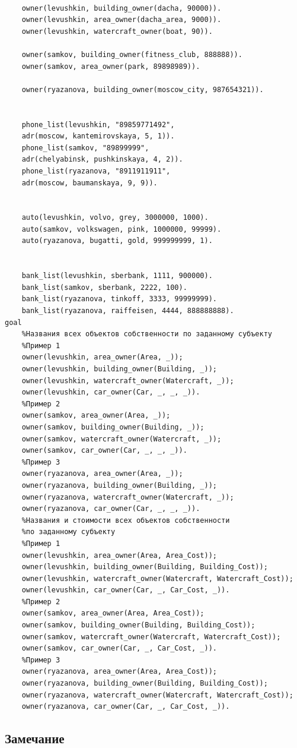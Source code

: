 \documentclass[a4paper,12pt]{article}
\begin{document}
\begin{verbatim}
	
	owner(levushkin, building_owner(dacha, 90000)).
	owner(levushkin, area_owner(dacha_area, 9000)).
	owner(levushkin, watercraft_owner(boat, 90)).
	
	owner(samkov, building_owner(fitness_club, 888888)).
	owner(samkov, area_owner(park, 89898989)).
	
	owner(ryazanova, building_owner(moscow_city, 987654321)).
	
	
	phone_list(levushkin, "89859771492", 
	adr(moscow, kantemirovskaya, 5, 1)).
	phone_list(samkov, "89899999", 
	adr(chelyabinsk, pushkinskaya, 4, 2)).
	phone_list(ryazanova, "8911911911", 
	adr(moscow, baumanskaya, 9, 9)).
	
	
	auto(levushkin, volvo, grey, 3000000, 1000).
	auto(samkov, volkswagen, pink, 1000000, 99999).
	auto(ryazanova, bugatti, gold, 999999999, 1).
	
	
	bank_list(levushkin, sberbank, 1111, 900000).
	bank_list(samkov, sberbank, 2222, 100).
	bank_list(ryazanova, tinkoff, 3333, 99999999).
	bank_list(ryazanova, raiffeisen, 4444, 888888888).
goal
	%Названия всех объектов собственности по заданному субъекту
	%Пример 1
	owner(levushkin, area_owner(Area, _));
	owner(levushkin, building_owner(Building, _));
	owner(levushkin, watercraft_owner(Watercraft, _));
	owner(levushkin, car_owner(Car, _, _, _)).
	%Пример 2
	owner(samkov, area_owner(Area, _));
	owner(samkov, building_owner(Building, _));
	owner(samkov, watercraft_owner(Watercraft, _));
	owner(samkov, car_owner(Car, _, _, _)).
	%Пример 3
	owner(ryazanova, area_owner(Area, _));
	owner(ryazanova, building_owner(Building, _));
	owner(ryazanova, watercraft_owner(Watercraft, _));
	owner(ryazanova, car_owner(Car, _, _, _)).
	%Названия и стоимости всех объектов собственности 
	%по заданному субъекту
	%Пример 1
	owner(levushkin, area_owner(Area, Area_Cost));
	owner(levushkin, building_owner(Building, Building_Cost));
	owner(levushkin, watercraft_owner(Watercraft, Watercraft_Cost));
	owner(levushkin, car_owner(Car, _, Car_Cost, _)).
	%Пример 2
	owner(samkov, area_owner(Area, Area_Cost));
	owner(samkov, building_owner(Building, Building_Cost));
	owner(samkov, watercraft_owner(Watercraft, Watercraft_Cost));
	owner(samkov, car_owner(Car, _, Car_Cost, _)).
	%Пример 3
	owner(ryazanova, area_owner(Area, Area_Cost));
	owner(ryazanova, building_owner(Building, Building_Cost));
	owner(ryazanova, watercraft_owner(Watercraft, Watercraft_Cost));
	owner(ryazanova, car_owner(Car, _, Car_Cost, _)).
	\end{verbatim}
	
	\subsection*{Замечание}
	
\end{document}
